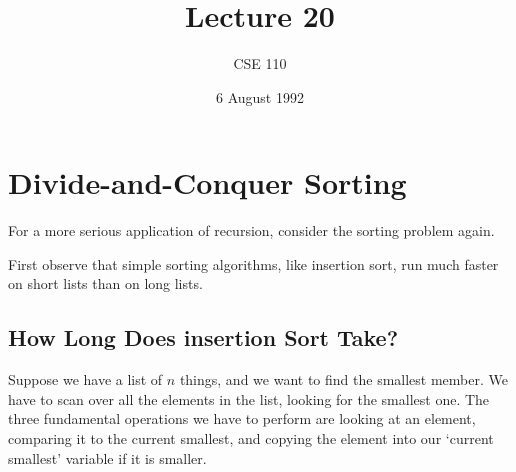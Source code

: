 %
%
%


\def\brac#1{$<${#1}$>$}
\def\Int{{\tt int}}
\def\int{\brac{\Int}}
\def\int{\brac{\Int}}
\def\Shortint{{\tt short~int}}
\def\shortint{\brac{\Shortint}}
\def\Longint{{\tt long~int}}
\def\longint{\brac{\Longint}}
\def\Float{{\tt float}}
\def\float{\brac{\Float}}
\def\Double{{\tt double}}
\def\double{\brac{\Double}}
\def\Char{{\tt char}}
\def\chr{\brac{\Char}}
\def\Void{{\tt void}}
\def\void{\brac{\Void}}

\def\ptr#1{pointer~to {#1}}
\def\p2#1{\brac{\ptr{#1}}}
\def\Ano#1#2{array~of {#1}~{#2}s}
\def\ano#1#2{\brac{\Ano{#1}{#2}}}
\def\Ao#1{array~of {#1}}
\def\ao#1{\brac{\Ao#1}}

\def\np{{\tt NULL} pointer}

\def\breakhere{\mbox{$\otimes$}}


\title{Lecture 20}
\author{CSE 110}
\date{6 August 1992}

\parskip 8pt

\pagestyle{fancy}
\rhead{\thepage}
\cfoot{}


\maketitle

\section{Divide-and-Conquer Sorting}

For a more serious application of recursion, consider the sorting
problem again.

First observe that simple sorting algorithms, like insertion sort, run much
faster on short lists than on long lists.

\subsection{How Long Does insertion Sort Take?}

    Suppose we have a list of $n$ things, and we want to find the
smallest member.  We have to scan over all the elements in the list,
looking for the smallest one.  The three fundamental operations we have
to perform are looking at an element, comparing it to the current
smallest, and copying the element into our `current smallest' variable
if it is smaller.

